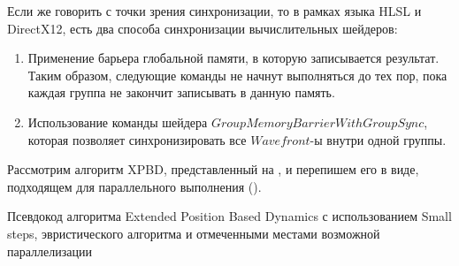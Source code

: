 	Если же говорить с точки зрения синхронизации, то в рамках языка HLSL и DirectX12, есть два способа синхронизации вычислительных шейдеров:
	\begin{enumerate}[1.]
		\item Применение барьера глобальной памяти, в которую записывается результат. Таким образом, следующие команды не начнут выполняться до тех пор, пока каждая группа не закончит записывать в данную память.
		\item Использование команды шейдера $GroupMemoryBarrierWithGroupSync$, которая позволяет синхронизировать все $Wavefront$-ы внутри одной группы.
	\end{enumerate}
	
	Рассмотрим алгоритм XPBD, представленный на , и перепишем его в виде, подходящем для параллельного выполнения ().

\begin{algorithm} [h]
	\nonl{}
	\caption{Псевдокод алгоритма Extended Position Based Dynamics с использованием Small steps, эвристического алгоритма и отмеченными местами возможной параллелизации}\label{alg:HeuristicParallelXPBD}
\end{algorithm}


